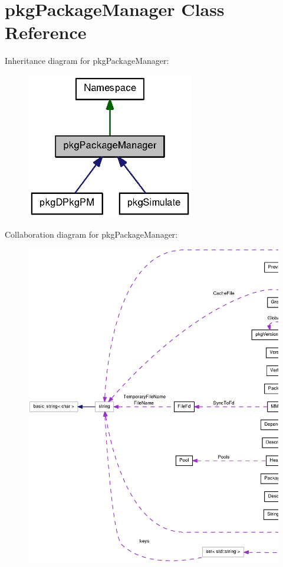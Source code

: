 \section{pkg\-Package\-Manager \-Class \-Reference}
\label{classpkgPackageManager}


\-Inheritance diagram for pkg\-Package\-Manager\-:
\nopagebreak
\begin{figure}[H]
\begin{center}
\leavevmode
\includegraphics[width=208pt]{classpkgPackageManager__inherit__graph}
\end{center}
\end{figure}


\-Collaboration diagram for pkg\-Package\-Manager\-:
\nopagebreak
\begin{figure}[H]
\begin{center}
\leavevmode
\includegraphics[width=350pt]{classpkgPackageManager__coll__graph}
\end{center}
\end{figure}
